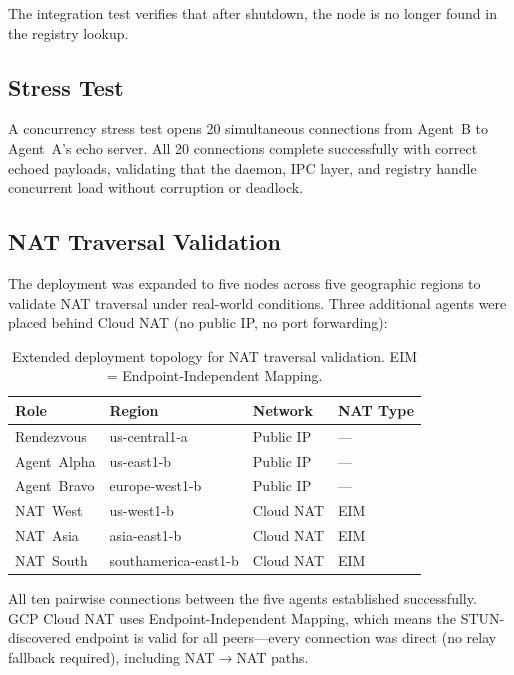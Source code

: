 \documentclass[11pt,a4paper]{article}
\begin{document}
The integration test verifies that after shutdown, the node is no longer found in the registry lookup.

\subsection{Stress Test}

A concurrency stress test opens 20 simultaneous connections from Agent~B to Agent~A's echo server. All 20 connections complete successfully with correct echoed payloads, validating that the daemon, IPC layer, and registry handle concurrent load without corruption or deadlock.

\subsection{NAT Traversal Validation}

The deployment was expanded to five nodes across five geographic regions to validate NAT traversal under real-world conditions. Three additional agents were placed behind Cloud NAT (no public IP, no port forwarding):

\begin{table}[h]
\centering
\begin{tabular}{@{}llll@{}}
\toprule
\textbf{Role} & \textbf{Region} & \textbf{Network} & \textbf{NAT Type} \\
\midrule
Rendezvous     & us-central1-a      & Public IP          & --- \\
Agent~Alpha    & us-east1-b         & Public IP          & --- \\
Agent~Bravo    & europe-west1-b     & Public IP          & --- \\
NAT~West       & us-west1-b         & Cloud NAT          & EIM \\
NAT~Asia       & asia-east1-b       & Cloud NAT          & EIM \\
NAT~South      & southamerica-east1-b & Cloud NAT        & EIM \\
\bottomrule
\end{tabular}
\caption{Extended deployment topology for NAT traversal validation. EIM = Endpoint-Independent Mapping.}
\label{tab:nat-deployment}
\end{table}

All ten pairwise connections between the five agents established successfully. GCP Cloud NAT uses Endpoint-Independent Mapping, which means the STUN-discovered endpoint is valid for all peers---every connection was direct (no relay fallback required), including NAT$\rightarrow$NAT paths.
\end{document}
